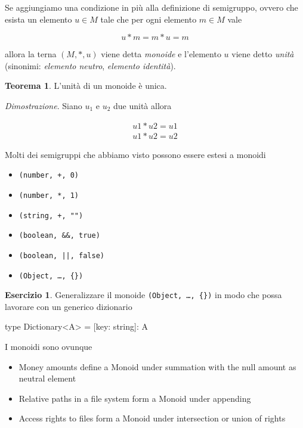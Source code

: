 \documentclass[12pt]{article}
\theoremstyle{definition}
\newtheorem{theorem}{Teorema}[section]
\newtheorem{exercise}{Esercizio}[section]
\newenvironment{code}
  {\vspace{0.5cm} \VerbatimEnvironment\begin{typescriptcode}}
  {\end{typescriptcode} \vspace{0.2cm}}
\begin{document}
Se aggiungiamo una condizione in più alla definizione di semigruppo, ovvero che esista un elemento $u \in M$
tale che per ogni elemento $m \in M$ vale

$$
u * m = m * u = m
$$

allora la terna $(M, *, u)$ viene detta \emph{monoide} e l'elemento $u$ viene detto \emph{unità}
(sinonimi: \emph{elemento neutro}, \emph{elemento identità}).

\begin{theorem}
L'unità di un monoide è unica.
\end{theorem}

\emph{Dimostrazione}. Siano $u_1$ e $u_2$ due unità allora

\begin{eqnarray}
u1 * u2 = u1 \\
u1 * u2 = u2
\end{eqnarray}

Molti dei semigruppi che abbiamo visto possono essere estesi a monoidi

\begin{itemize}
  \item \texttt{(number, +, 0)}
  \item \texttt{(number, *, 1)}
  \item \texttt{(string, +, "")}
  \item \texttt{(boolean, \&\&, true)}
  \item \texttt{(boolean, ||, false)}
  \item \texttt{(Object, \ldots, \{\})}
\end{itemize}

\begin{exercise}
Generalizzare il monoide \texttt{(Object, \ldots, \{\})} in modo che possa lavorare con un generico dizionario
\begin{code}
type Dictionary<A> = { [key: string]: A }
\end{code}
\end{exercise}

I monoidi sono ovunque

\begin{itemize}
  \item Money amounts define a Monoid under summation with the null amount as neutral element
  \item Relative paths in a file system form a Monoid under appending
  \item Access rights to files form a Monoid under intersection or union of rights
\end{itemize}
\end{document}
